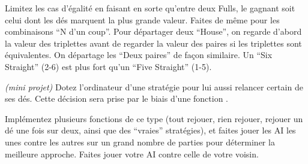 \documentclass[10pt]{article}\usepackage[nu]{esial}
\begin{document}
\begin{Exercice}
  \Question Limitez les cas d'égalité en faisant en sorte qu'entre deux Fulls,
  le gagnant soit celui dont les dés marquent la plus grande valeur. Faites de
  même pour les combinaisons ``N d'un coup''. Pour départager deux ``House'',
  on regarde d'abord la valeur des triplettes avant de regarder la valeur des
  paires si les triplettes sont équivalentes. On départage les ``Deux paires''
  de façon similaire. Un ``Six Straight'' (2-6) est plus fort qu'un ``Five
  Straight'' (1-5).

  \Question \textit{(mini projet)} Dotez l'ordinateur d'une stratégie pour lui
  aussi relancer certain de ses dés. Cette décision sera prise par le biais
  d'une fonction . 

  \Question Implémentez plusieurs fonctions de ce type (tout rejouer, rien
  rejouer, rejouer un dé une fois sur deux, ainsi que des ``vraies''
  stratégies), et faites jouer les AI les unes contre les autres sur un grand
  nombre de parties pour déterminer la meilleure approche. Faites jouer votre
  AI contre celle de votre voisin.
\end{Exercice}
\end{document}
